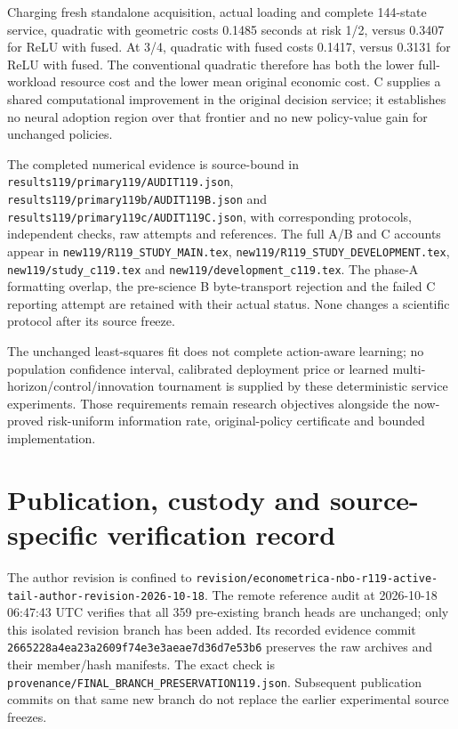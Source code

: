 Charging fresh standalone acquisition, actual loading and complete 144-state service, quadratic with geometric costs 0.1485 seconds at risk 1/2, versus 0.3407 for ReLU with fused. At 3/4, quadratic with fused costs 0.1417, versus 0.3131 for ReLU with fused. The conventional quadratic therefore has both the lower full-workload resource cost and the lower mean original economic cost. C supplies a shared computational improvement in the original decision service; it establishes no neural adoption region over that frontier and no new policy-value gain for unchanged policies.

The completed numerical evidence is source-bound in \nolinkurl{results119/primary119/AUDIT119.json}, \nolinkurl{results119/primary119b/AUDIT119B.json} and \nolinkurl{results119/primary119c/AUDIT119C.json}, with corresponding protocols, independent checks, raw attempts and references. The full A/B and C accounts appear in \nolinkurl{new119/R119_STUDY_MAIN.tex}, \nolinkurl{new119/R119_STUDY_DEVELOPMENT.tex}, \nolinkurl{new119/study_c119.tex} and \nolinkurl{new119/development_c119.tex}. The phase-A formatting overlap, the pre-science B byte-transport rejection and the failed C reporting attempt are retained with their actual status. None changes a scientific protocol after its source freeze.

The unchanged least-squares fit does not complete action-aware learning; no population confidence interval, calibrated deployment price or learned multi-horizon/control/innovation tournament is supplied by these deterministic service experiments. Those requirements remain research objectives alongside the now-proved risk-uniform information rate, original-policy certificate and bounded implementation.



\hypertarget{publication-custody-and-source-specific-verification-record}{%
\section{Publication, custody and source-specific verification record}\label{publication-custody-and-source-specific-verification-record}}

The author revision is confined to \nolinkurl{revision/econometrica-nbo-r119-active-tail-author-revision-2026-10-18}. The remote reference audit at 2026-10-18 06:47:43 UTC verifies that all 359 pre-existing branch heads are unchanged; only this isolated revision branch has been added. Its recorded evidence commit \nolinkurl{2665228a4ea23a2609f74e3e3aeae7d36d7e53b6} preserves the raw archives and their member/hash manifests. The exact check is \nolinkurl{provenance/FINAL_BRANCH_PRESERVATION119.json}. Subsequent publication commits on that same new branch do not replace the earlier experimental source freezes.


